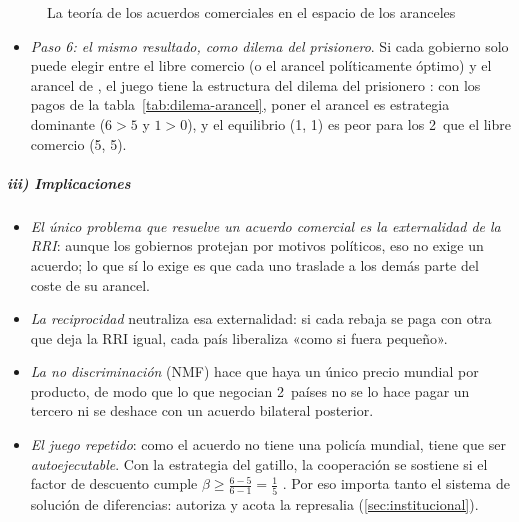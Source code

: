 \documentclass[11pt]{article}
\begin{document}
\begin{figure}[H]
\centering
\caption{La teoría de los acuerdos comerciales en el espacio de los aranceles}\label{fig:bagwell-staiger}
\end{figure}

\begin{itemize}
\item \emph{Paso 6: el mismo resultado, como dilema del prisionero}. Si cada gobierno solo puede elegir entre el libre comercio (o el arancel políticamente óptimo) y el arancel de , el juego tiene la estructura del dilema del prisionero : con los pagos de la tabla~\ref{tab:dilema-arancel}, poner el arancel es estrategia dominante ($6>5$ y $1>0$), y el equilibrio (1, 1) es peor para los 2~que el libre comercio (5, 5).
\end{itemize}


\subparagraph{iii) Implicaciones}

\begin{itemize}
\item \emph{El único problema que resuelve un acuerdo comercial es la externalidad de la RRI}: aunque los gobiernos protejan por motivos políticos, eso no exige un acuerdo; lo que sí lo exige es que cada uno traslade a los demás parte del coste de su arancel.
\item \emph{La reciprocidad} neutraliza esa externalidad: si cada rebaja se paga con otra que deja la RRI igual, cada país liberaliza «como si fuera pequeño».
\item \emph{La no discriminación} (NMF) hace que haya un único precio mundial por producto, de modo que lo que negocian 2~países no se lo hace pagar un tercero ni se deshace con un acuerdo bilateral posterior.
\item \emph{El juego repetido}: como el acuerdo no tiene una policía mundial, tiene que ser \emph{autoejecutable}. Con la estrategia del gatillo, la cooperación se sostiene si el factor de descuento cumple $\beta\geq\frac{6-5}{6-1}=\frac15$ . Por eso importa tanto el sistema de solución de diferencias: autoriza y acota la represalia (\ref{sec:institucional}).
\end{itemize}
\end{document}
